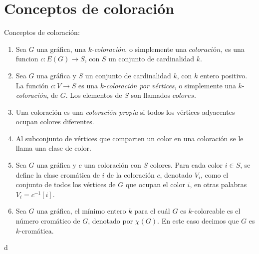 \section{Conceptos de coloraci\'on}
\label{sec:coloracion}

\begin{definicion} Conceptos de coloraci\'on:
    \label{def:coloracion}
    \begin{enumerate}
        \item Sea $G$ una gr\'afica, una $k$-\textit{coloraci\'on}, o
        simplemente una $\textit{coloraci\'on}$, es una funcion $c \colon
        E(G)\to S$, con $S$ un conjunto de cardinalidad $k$.
        \item Sea $G$ una gr\'afica y $S$ un conjunto de cardinalidad $k$, con
        $k$ entero positivo. La funci\'on $c: V \to S$ es una
        $k$-\textit{coloraci\'on por v\'ertices}, o simplemente una
        $k$-\textit{coloraci\'on}, de $G$. Los elementos de $S$ son llamados
        $\textit{colores}$.
        \item Una coloraci\'on es una \textit{coloraci\'on propia} si todos los
        v\'ertices adyacentes ocupan colores diferentes.
        \item Al subconjunto de v\'ertices que comparten un color en una
        coloraci\'on se le llama una clase de color.
        \item Sea $G$ una gr\'afica y $c$ una coloraci\'on con $S$ colores. Para
        cada color $i \in S$, se define la clase crom\'atica de $i$ de la
        coloraci\'on $c$, denotado $V_i$, como el conjunto de todos los
        v\'ertices de $G$ que ocupan el color $i$, en otras palabras $V_i =
        c^{-1}[i]$.
        \item  Sea $G$ una gr\'afica, el m\'inimo entero $k$ para el cu\'al $G$
        es $k$-coloreable es el n\'umero crom\'atico de $G$, denotado por
        $\chi(G)$. En este caso decimos que $G$ es $k$-crom\'atica.
    \end{enumerate}
\end{definicion}d

